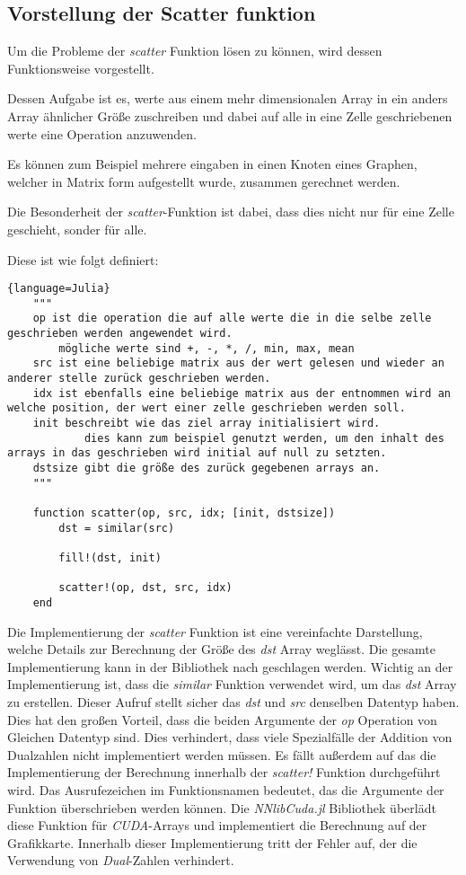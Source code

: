 \subsection{Vorstellung der Scatter funktion}

Um die Probleme der \textit{scatter} Funktion lösen zu können, 
wird dessen Funktionsweise vorgestellt.

Dessen Aufgabe ist es, werte aus einem mehr dimensionalen Array 
in ein anders Array ähnlicher Größe zuschreiben 
und dabei auf alle in eine Zelle geschriebenen werte eine Operation anzuwenden.


Es können zum Beispiel mehrere eingaben in einen Knoten eines Graphen, 
welcher in Matrix form aufgestellt wurde,
zusammen gerechnet werden.

Die Besonderheit der \textit{scatter}-Funktion ist dabei, 
dass dies nicht nur für eine Zelle geschieht, sonder für alle.

Diese ist wie folgt definiert:

\begin{lstlisting}{language=Julia}
	"""
	op ist die operation die auf alle werte die in die selbe zelle geschrieben werden angewendet wird.
		mögliche werte sind +, -, *, /, min, max, mean
	src ist eine beliebige matrix aus der wert gelesen und wieder an anderer stelle zurück geschrieben werden.
	idx ist ebenfalls eine beliebige matrix aus der entnommen wird an welche position, der wert einer zelle geschrieben werden soll.
	init beschreibt wie das ziel array initialisiert wird.
			dies kann zum beispiel genutzt werden, um den inhalt des arrays in das geschrieben wird initial auf null zu setzten.
	dstsize gibt die größe des zurück gegebenen arrays an.
	"""

	function scatter(op, src, idx; [init, dstsize])
		dst = similar(src)
		
		fill!(dst, init)
		
		scatter!(op, dst, src, idx)
	end
\end{lstlisting}

Die Implementierung der \textit{scatter} Funktion ist eine vereinfachte Darstellung, 
welche Details zur Berechnung der Größe des \textit{dst} Array weglässt.
Die gesamte Implementierung kann in der  Bibliothek \cite{} nach geschlagen werden.
Wichtig an der Implementierung ist, dass die \textit{similar} Funktion verwendet wird, um das
\textit{dst} Array zu erstellen.
Dieser Aufruf stellt sicher das \textit{dst} und \textit{src} denselben Datentyp haben.
Dies hat den großen Vorteil, 
dass die beiden Argumente der \textit{op} Operation von Gleichen Datentyp sind.
Dies verhindert, 
dass viele Spezialfälle der Addition von Dualzahlen nicht implementiert werden müssen.
Es fällt außerdem auf das die Implementierung der Berechnung innerhalb der \textit{scatter!} Funktion
durchgeführt wird.
Das Ausrufezeichen im Funktionsnamen bedeutet, das die Argumente der Funktion überschrieben werden können.
Die \textit{NNlibCuda.jl} Bibliothek überlädt diese Funktion für \textit{CUDA}-Arrays und
implementiert die Berechnung auf der Grafikkarte.
Innerhalb dieser Implementierung tritt der Fehler auf, der die Verwendung von \textit{Dual}-Zahlen
verhindert.